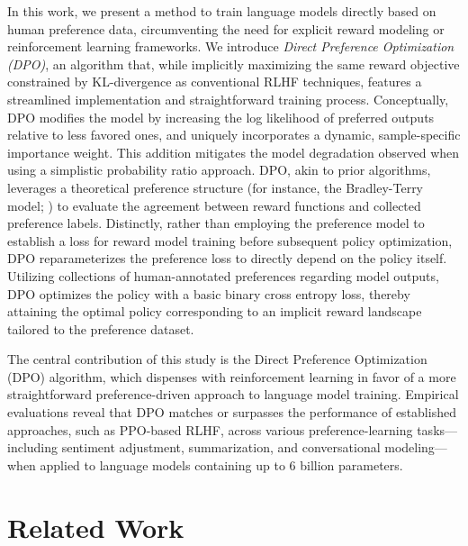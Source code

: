 In this work, we present a method to train language models directly based on human preference data, circumventing the need for explicit reward modeling or reinforcement learning frameworks. We introduce \textit{Direct Preference Optimization (DPO)}, an algorithm that, while implicitly maximizing the same reward objective constrained by KL-divergence as conventional RLHF techniques, features a streamlined implementation and straightforward training process. Conceptually, DPO modifies the model by increasing the log likelihood of preferred outputs relative to less favored ones, and uniquely incorporates a dynamic, sample-specific importance weight. This addition mitigates the model degradation observed when using a simplistic probability ratio approach. DPO, akin to prior algorithms, leverages a theoretical preference structure (for instance, the Bradley-Terry model; \cite{bradley1952rankanalysis}) to evaluate the agreement between reward functions and collected preference labels. Distinctly, rather than employing the preference model to establish a loss for reward model training before subsequent policy optimization, DPO reparameterizes the preference loss to directly depend on the policy itself. Utilizing collections of human-annotated preferences regarding model outputs, DPO optimizes the policy with a basic binary cross entropy loss, thereby attaining the optimal policy corresponding to an implicit reward landscape tailored to the preference dataset.

The central contribution of this study is the Direct Preference Optimization (DPO) algorithm, which dispenses with reinforcement learning in favor of a more straightforward preference-driven approach to language model training. Empirical evaluations reveal that DPO matches or surpasses the performance of established approaches, such as PPO-based RLHF, across various preference-learning tasks—including sentiment adjustment, summarization, and conversational modeling—when applied to language models containing up to 6 billion parameters.

\section{Related Work}


